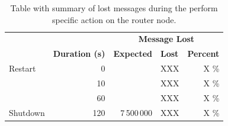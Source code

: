 \begingroup
\setlength{\tabcolsep}{10pt} %
\renewcommand{\arraystretch}{1.35} %
	\begin{table}[H]
	\centering
	\caption{Table with summary of lost messages during the perform specific action on the router node. }
	\label{tab:agent_demonstration}
	\begin{tabular}{|l|r|r|r|r|}
	\hline
	\rowcolor[HTML]{C5E3DF}
	\cellcolor[HTML]{C5E3DF}                                  & \multicolumn{1}{c|}{\cellcolor[HTML]{C5E3DF}}                                        & \multicolumn{3}{c|}{\cellcolor[HTML]{C5E3DF}\textbf{Message Lost}}                                                                                                                          \\ \cline{3-5}
	\rowcolor[HTML]{C5E3DF}
	\multirow{-2}{*}{\cellcolor[HTML]{C5E3DF}\textbf{Action}} & \multicolumn{1}{c|}{\multirow{-2}{*}{\cellcolor[HTML]{C5E3DF}\textbf{Duration (s)}}} & \multicolumn{1}{l|}{\cellcolor[HTML]{C5E3DF}\textbf{Expected}} & \multicolumn{1}{l|}{\cellcolor[HTML]{C5E3DF}\textbf{Lost}} & \multicolumn{1}{l|}{\cellcolor[HTML]{C5E3DF}\textbf{Percent}} \\ \hline
	Restart                                                   & 0                                                                                    &                                                                & XXX                                                        & X \%                                                          \\ \cline{1-2} \cline{4-5}
	                                                          & 10                                                                                   &                                                                & XXX                                                        & X \%                                                          \\ \cline{2-2} \cline{4-5}
	                                                          & 60                                                                                   &                                                                & XXX                                                        & X \%                                                          \\ \cline{2-2} \cline{4-5}
	\multirow{-3}{*}{Shutdown}                                & 120                                                                                  & \multirow{-4}{*}{7\,500\,000}                                      & XXX                                                        & X \%                                                          \\ \hline
	\end{tabular}
	\end{table}
\endgroup


